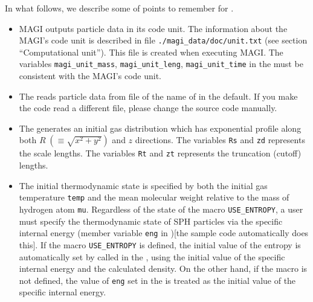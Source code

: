 In what follows, we describe some of points to remember for \procedure {}.
\begin{itemize}
\item MAGI outputs particle data in its code unit. The information about the MAGI's code unit is described in file \texttt{./magi\_data/doc/unit.txt} (see section ``Computational unit''). This file is created when executing \textsc{MAGI}. The variables \texttt{magi\_unit\_mass}, \texttt{magi\_unit\_leng}, \texttt{magi\_unit\_time} in the \procedure must be consistent with the MAGI's code unit.
\item The \procedure reads particle data from file of the name of  in the default. If you make the code read a different file, please change the source code manually.
\item The \procedure generates an initial gas distribution which has exponential profile along both $R\; (\equiv \sqrt{x^{2}+y^{2}})$ and $z$ directions. The variables \texttt{Rs} and \texttt{zd} represents the scale lengths. The variables \texttt{Rt} and \texttt{zt} represents the truncation (cutoff) lengths.
\item The initial thermodynamic state is specified by both the initial gas temperature \texttt{temp} and the mean molecular weight relative to the mass of hydrogen atom \texttt{mu}.  Regardless of the state of the macro \texttt{USE\_ENTROPY}, a user must specify the thermodynamic state of SPH particles via the specific internal energy (member variable \texttt{eng} in )[the sample code automatically does this]. If the macro \texttt{USE\_ENTROPY} is defined, the initial value of the entropy is automatically set by \procedure {} called in the \procedure \mainFuncName, using the initial value of the specific internal energy and the calculated density. On the other hand, if the macro is not defined, the value of \texttt{eng} set in the \procedure {} is treated as the initial value of the specific internal energy.
\end{itemize}

